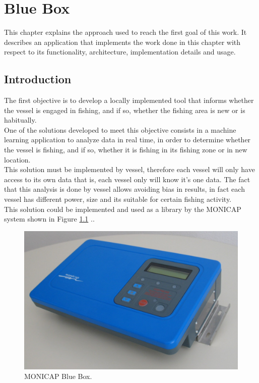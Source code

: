 % 
%  
%
\chapter{Blue Box}
\label{cha:blue_box}
This chapter explains the approach used to reach the first goal of this work. It describes an application that implements the work done in this chapter with respect to its functionality, architecture, implementation details and usage.  

\section{Introduction} %
\label{sec:introduction}
The first objective is to develop a locally implemented tool that informs whether the vessel is engaged in fishing, and if so, whether the fishing area is new or is habitually.\\
One of the solutions developed to meet this objective consists in a machine learning application to analyze data in real time, in order to determine whether the vessel is fishing, and if so, whether it is fishing in its fishing zone or in new location.\\
This solution must be implemented by vessel, therefore each vessel will only have access to its own data that is, each vessel only will know it’s one data.
The fact that this analysis is done by vessel allows avoiding bias in results, in fact each vessel has different power, size and its suitable for certain fishing activity.\\
This solution could be implemented and used as a library by the MONICAP system shown in Figure \ref{fig:monicap} .\cite{WEBSITE:MonicapXsealence}.

\begin{figure}[H]
    \centering
    \includegraphics[width=0.8\linewidth]{Chapters/img/equipamento_monicap.png}
    \caption{MONICAP Blue Box.}
    \label{fig:monicap}
\end{figure}

